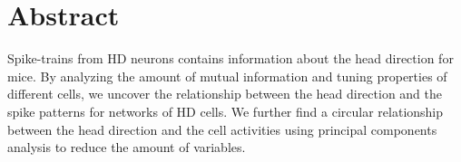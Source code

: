 \section{Abstract}
Spike-trains from HD neurons contains information about the head direction for mice. By analyzing the amount of mutual information and tuning properties of different cells, we uncover the relationship between the head direction and the spike patterns for networks of HD cells. We further find a circular relationship between the head direction and the cell activities using principal components analysis to reduce the amount of variables.